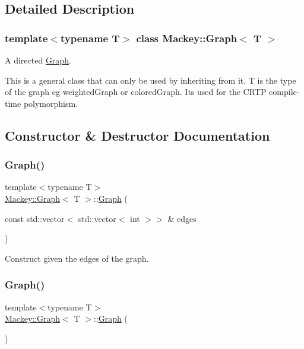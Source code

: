\subsection{Detailed Description}
\subsubsection*{template$<$typename T$>$\newline
class Mackey\+::\+Graph$<$ T $>$}

A directed \hyperlink{classMackey_1_1Graph}{Graph}. 

This is a general class that can only be used by inheriting from it. T is the type of the graph eg weighted\+Graph or colored\+Graph. It\textquotesingle{}s used for the C\+R\+TP compile-\/time polymorphism. 

\subsection{Constructor \& Destructor Documentation}
\mbox{\label{classMackey_1_1Graph_a4f0ca7cec28645835bbad29b8c00992c}} 
\subsubsection{\texorpdfstring{Graph()}{Graph()}\hspace{0.1cm}{\footnotesize\ttfamily [1/2]}}
{\footnotesize\ttfamily template$<$typename T$>$ \\
\hyperlink{classMackey_1_1Graph}{Mackey\+::\+Graph}$<$ T $>$\+::\hyperlink{classMackey_1_1Graph}{Graph} (\begin{DoxyParamCaption}\item[{const std\+::vector$<$ std\+::vector$<$ int $>$$>$ \&}]{edges }\end{DoxyParamCaption})\hspace{0.3cm}{\ttfamily [inline]}}



Construct given the edges of the graph. 

\mbox{\label{classMackey_1_1Graph_a910e6687de1a1a90df5b656e3c850a01}} 
\subsubsection{\texorpdfstring{Graph()}{Graph()}\hspace{0.1cm}{\footnotesize\ttfamily [2/2]}}
{\footnotesize\ttfamily template$<$typename T$>$ \\
\hyperlink{classMackey_1_1Graph}{Mackey\+::\+Graph}$<$ T $>$\+::\hyperlink{classMackey_1_1Graph}{Graph} (\begin{DoxyParamCaption}{ }\end{DoxyParamCaption})\hspace{0.3cm}{\ttfamily [inline]}}



